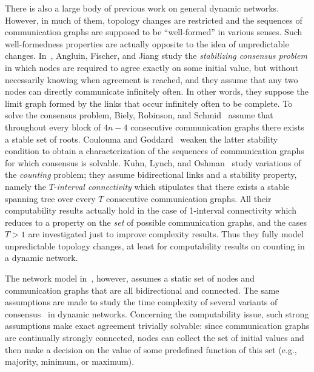 \documentclass[a4paper]{article}
\theoremstyle{newthm}
\begin{document}
There is also a large body of previous work  on general dynamic networks.
However, in much of them, topology changes are restricted and the sequences of
	communication graphs are supposed to be ``well-formed'' in  various senses.
Such well-formedness properties are actually opposite to the idea of
	unpredictable changes.
In~\cite{AFJ06}, Angluin, Fischer, and Jiang study the {\em stabilizing consensus problem}
	in which nodes are required to agree exactly on some initial value, but without necessarily 
	knowing  when agreement is reached, and they
	assume  that any two nodes can directly communicate infinitely often.
In other words, they suppose the limit graph formed by the links that occur infinitely often to be complete.
To solve the consensus problem, Biely, Robinson, and Schmid~\cite{BRS12} assume that 
	throughout every block of $4n-4$ consecutive communication graphs there exists 
	a stable set of roots.
Coulouma and Goddard~\cite{CG13} weaken the latter stability condition to obtain a characterization
	of the sequences of communication  graphs for which consensus is solvable.
Kuhn, Lynch, and Oshman~\cite{KLO10} study  variations of the {\em counting}  problem; they  
	assume bidirectional links and a stability property, namely the $T$-{\em interval
	connectivity} which stipulates that there exists a stable spanning tree over every $T$ consecutive 
	communication graphs.
All their computability results actually hold in the case of 1-interval connectivity which reduces to
	a property on the {\em set} of possible communication graphs, and the cases $T>1$ are 
	investigated just to improve complexity results.
Thus they  fully model unpredictable topology changes, at least for computability results
	on counting in a dynamic network.
	
The network model in~\cite{KLO10}, however, assumes a static set of nodes and communication graphs 
	that are all bidirectional  and connected.
The same  assumptions are made to study the time complexity of several variants of consensus~\cite{KMO11}
	in dynamic networks.
Concerning the computability issue,  such strong assumptions make exact agreement trivially solvable: 
	since communication graphs are continually strongly connected, nodes can collect the set of initial values
	and then make a decision on the value of some predefined function of this set
	(e.g., majority, minimum, or maximum).	
\end{document}
